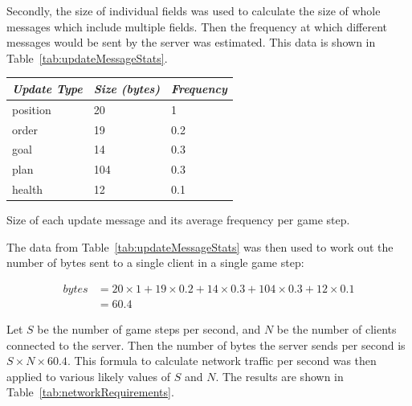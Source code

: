 Secondly, the size of individual fields was used to calculate the size of whole messages which include multiple fields. Then the frequency at which different messages would be sent by the server was estimated. This data is shown in Table~\ref{tab:updateMessageStats}.

\begin{margintable}
    \begin{tabular}{p{5em} p{5em} p{5em}}
    \toprule
    \emph{Update Type} & \emph{Size (bytes)} & \emph{Frequency} \\
    \midrule
    position & 20 & 1 \\ 
    order & 19 & 0.2 \\
    goal & 14 & 0.3 \\
    plan & 104 & 0.3 \\
    health & 12 & 0.1 \\   
    \bottomrule
    \end{tabular}
    	\vspace{1em}
	\caption[Update message statistics]{Size of each update message and its average frequency per game step.}
	\label{tab:updateMessageStats}
\end{margintable}

The data from Table~\ref{tab:updateMessageStats} was then used to work out the number of bytes sent to a single client in a single game step:

\begin{align*}
bytes &= 20 \times 1 + 19 \times 0.2 + 14 \times 0.3 + 104 \times 0.3 + 12 \times 0.1 \\
      &= 60.4
\end{align*}

Let $S$ be the number of game steps per second, and $N$ be the number of clients connected to the server. Then the number of bytes the server sends per second is $S \times N \times 60.4$. This formula to calculate network traffic per second was then applied to various likely values of $S$ and $N$. The results are shown in Table~\ref{tab:networkRequirements}.

